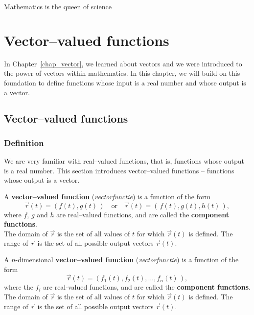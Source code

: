 \begin{savequote}[75mm]
Mathematics is the queen of science
\end{savequote}

\chapter{Vector--valued functions}
\label{chap_vector_fun}
\graphicspath{{figures/Vector_Fun/}}

In Chapter~\ref{chap_vector}, we learned about vectors and we were introduced to the power of vectors within mathematics. In this chapter, we will build on this foundation to define functions whose input is a real number and whose output is a vector. 

\section{Vector--valued functions}\label{sec:vvf}
\subsection{Definition}

We are very familiar with real--valued functions, that is, functions whose output is a real number. This section introduces vector--valued functions -- functions whose output is a vector. 

\ifcalculus
\begin{definition}\label{def:vvf} 
A \textbf{vector--valued function} (\textit{vectorfunctie}) is a function of the form 
$$\vec r(t) = \left(f(t),g(t)\,\right) \quad \text{or}\quad \vec r(t) = \left( \,f(t),g(t),h(t)\,\right),$$
where $f$, $g$ and $h$ are real--valued functions, and are called the \textbf{component functions}.\\

The domain of $\vec r$ is the set of all values of $t$ for which $\vec r(t)$ is defined. The range of $\vec r$ is the set of all possible output vectors $\vec r(t)$.
\end{definition}
\fi

\ifanalysis

\begin{definition}\label{def:vvf}
A $n$-dimensional \textbf{vector--valued function} (\textit{vectorfunctie}) is a function of the form 
$$\vec r(t) = \left( f_1(t),f_2(t),\ldots,f_n(t)\,\right),$$
where  the $f_i$ are real-valued functions, and are called the \textbf{component functions}.\\

The domain of $\vec r$ is the set of all values of $t$ for which $\vec r(t)$ is defined. The range of $\vec r$ is the set of all possible output vectors $\vec r(t)$.
\end{definition}

